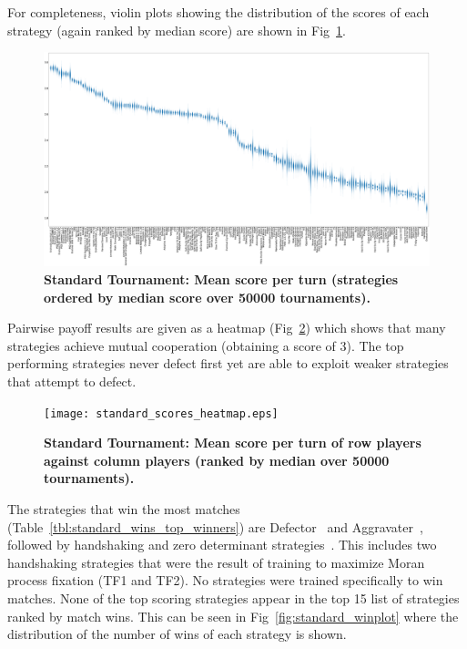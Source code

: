 \documentclass[10pt,letterpaper]{article}
\begin{document}
For completeness, violin plots showing the distribution of the scores of each
strategy (again ranked by median score) are shown in
Fig~\ref{fig:standard_boxplot}.

\begin{landscape}
    \begin{figure}[!hbtp]
        \centering
        \includegraphics[width=\paperwidth]{standard_scores_boxplots.eps}
        \caption{\bf Standard Tournament: Mean score per turn 
            (strategies ordered by median score over 50000 tournaments).}
        \label{fig:standard_boxplot}
    \end{figure}
\end{landscape}

Pairwise payoff results are given as a heatmap (Fig~\ref{fig:standard_heatmap})
which shows that many strategies achieve mutual cooperation (obtaining a score
of 3). The top performing
strategies never defect first yet are able to exploit weaker strategies that
attempt to defect.

\begin{figure}[!hbtp]
    \centering
    \texttt{[image: standard\_scores\_heatmap.eps]}
    \caption{\bf Standard Tournament: Mean score per turn of row players against
    column players (ranked by median over 50000 tournaments).}
    \label{fig:standard_heatmap}
\end{figure}

The strategies that win the most matches
(Table~\ref{tbl:standard_wins_top_winners}) are Defector~\cite{Axelrod1984} and Aggravater~\cite{axelrodproject}, followed
by handshaking and zero determinant strategies~\cite{Press2012}.
This includes two handshaking
strategies that were the result of training to maximize Moran process fixation
(TF1 and TF2). No strategies were trained specifically to win matches. None of
the top scoring strategies appear in the top 15 list of strategies ranked by
match wins. This can be seen in Fig~\ref{fig:standard_winplot} where the
distribution of the number of wins of each strategy is shown.
\end{document}
